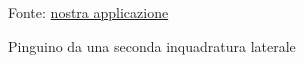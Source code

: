 \documentclass[crop=false, class=book]{standalone}
\begin{document}
	\begin{figure}
			\centering
			{Fonte: \url{nostra applicazione}}
			\caption{Pinguino da una seconda inquadratura laterale}
			\label{fig: pinguino angolo1}
	\end{figure}
		
\end{document}
